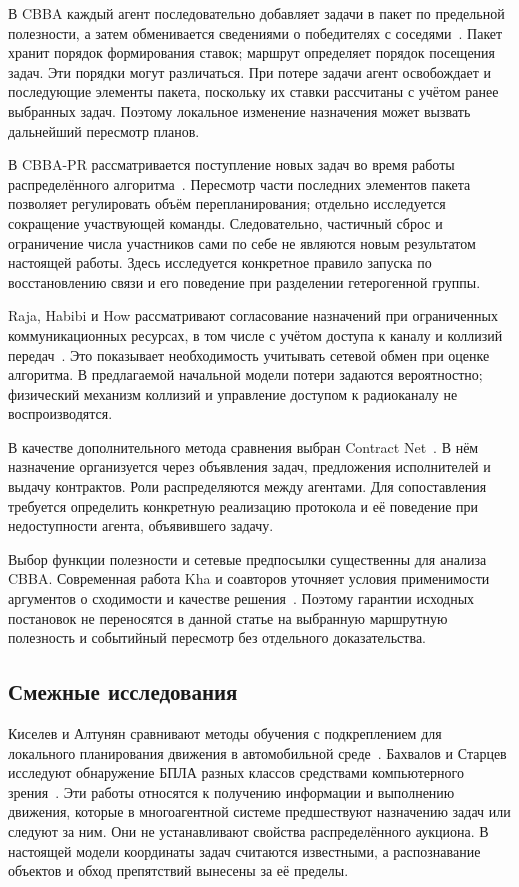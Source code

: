 \documentclass{misisarticle}
\begin{document}
В CBBA каждый агент последовательно добавляет задачи в пакет по предельной полезности, а затем обменивается сведениями о победителях с соседями~\cite{choi2009}. Пакет хранит порядок формирования ставок; маршрут определяет порядок посещения задач. Эти порядки могут различаться. При потере задачи агент освобождает и последующие элементы пакета, поскольку их ставки рассчитаны с учётом ранее выбранных задач. Поэтому локальное изменение назначения может вызвать дальнейший пересмотр планов.

В CBBA-PR рассматривается поступление новых задач во время работы распределённого алгоритма~\cite{buckman2019}. Пересмотр части последних элементов пакета позволяет регулировать объём перепланирования; отдельно исследуется сокращение участвующей команды. Следовательно, частичный сброс и ограничение числа участников сами по себе не являются новым результатом настоящей работы. Здесь исследуется конкретное правило запуска по восстановлению связи и его поведение при разделении гетерогенной группы.

Raja, Habibi и How рассматривают согласование назначений при ограниченных коммуникационных ресурсах, в том числе с учётом доступа к каналу и коллизий передач~\cite{raja2022}. Это показывает необходимость учитывать сетевой обмен при оценке алгоритма. В предлагаемой начальной модели потери задаются вероятностно; физический механизм коллизий и управление доступом к радиоканалу не воспроизводятся.

В качестве дополнительного метода сравнения выбран Contract Net~\cite{smith1980}. В нём назначение организуется через объявления задач, предложения исполнителей и выдачу контрактов. Роли распределяются между агентами. Для сопоставления требуется определить конкретную реализацию протокола и её поведение при недоступности агента, объявившего задачу.

Выбор функции полезности и сетевые предпосылки существенны для анализа CBBA. Современная работа Kha и соавторов уточняет условия применимости аргументов о сходимости и качестве решения~\cite{kha2025}. Поэтому гарантии исходных постановок не переносятся в данной статье на выбранную маршрутную полезность и событийный пересмотр без отдельного доказательства.

\subsection{Смежные исследования}

Киселев и Алтунян сравнивают методы обучения с подкреплением для локального планирования движения в автомобильной среде~\cite{kiselev2025}. Бахвалов и Старцев исследуют обнаружение БПЛА разных классов средствами компьютерного зрения~\cite{bakhvalov2025}. Эти работы относятся к получению информации и выполнению движения, которые в многоагентной системе предшествуют назначению задач или следуют за ним. Они не устанавливают свойства распределённого аукциона. В настоящей модели координаты задач считаются известными, а распознавание объектов и обход препятствий вынесены за её пределы.
\end{document}
